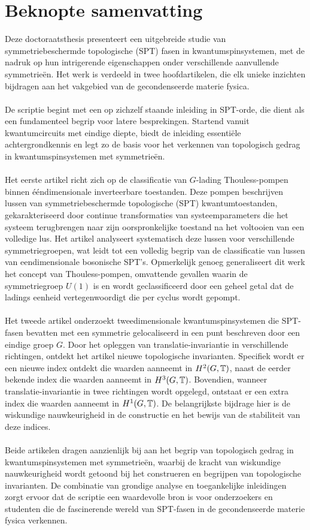 \chapter{Beknopte samenvatting}

Deze doctoraatsthesis presenteert een uitgebreide studie van symmetriebeschermde topologische (SPT) fasen in kwantumspinsystemen, met de nadruk op hun intrigerende eigenschappen onder verschillende aanvullende symmetrieën. Het werk is verdeeld in twee hoofdartikelen, die elk unieke inzichten bijdragen aan het vakgebied van de gecondenseerde materie fysica.
\\\\
De scriptie begint met een op zichzelf staande inleiding in SPT-orde, die dient als een fundamenteel begrip voor latere besprekingen. Startend vanuit kwantumcircuits met eindige diepte, biedt de inleiding essentiële achtergrondkennis en legt zo de basis voor het verkennen van topologisch gedrag in kwantumspinsystemen met symmetrieën.
\\\\
Het eerste artikel richt zich op de classificatie van $G$-lading Thouless-pompen binnen ééndimensionale inverteerbare toestanden. Deze pompen beschrijven lussen van symmetriebeschermde topologische (SPT) kwantumtoestanden, gekarakteriseerd door continue transformaties van systeemparameters die het systeem terugbrengen naar zijn oorspronkelijke toestand na het voltooien van een volledige lus. Het artikel analyseert systematisch deze lussen voor verschillende symmetriegroepen, wat leidt tot een volledig begrip van de classificatie van lussen van eendimensionale bosonische SPT's. Opmerkelijk genoeg generaliseert dit werk het concept van Thouless-pompen, omvattende gevallen waarin de symmetriegroep $U(1)$ is en wordt geclassificeerd door een geheel getal dat de ladings eenheid vertegenwoordigt die per cyclus wordt gepompt.
\\\\
Het tweede artikel onderzoekt tweedimensionale kwantumspinsystemen die SPT-fasen bevatten met een symmetrie gelocaliseerd in een punt beschreven door een eindige groep $G$. Door het opleggen van translatie-invariantie in verschillende richtingen, ontdekt het artikel nieuwe topologische invarianten. Specifiek wordt er een nieuwe index ontdekt die waarden aanneemt in $H^2(G,\mathbb T)$, naast de eerder bekende index die waarden aanneemt in $H^3(G,\mathbb T)$. Bovendien, wanneer translatie-invariantie in twee richtingen wordt opgelegd, ontstaat er een extra index die waarden aanneemt in $H^1(G,\mathbb T)$. De belangrijkste bijdrage hier is de wiskundige nauwkeurigheid in de constructie en het bewijs van de stabiliteit van deze indices.
\\\\
Beide artikelen dragen aanzienlijk bij aan het begrip van topologisch gedrag in kwantumspinsystemen met symmetrieën, waarbij de kracht van wiskundige nauwkeurigheid wordt getoond bij het construeren en begrijpen van topologische invarianten. De combinatie van grondige analyse en toegankelijke inleidingen zorgt ervoor dat de scriptie een waardevolle bron is voor onderzoekers en studenten die de fascinerende wereld van SPT-fasen in de gecondenseerde materie fysica verkennen.

\cleardoublepage

